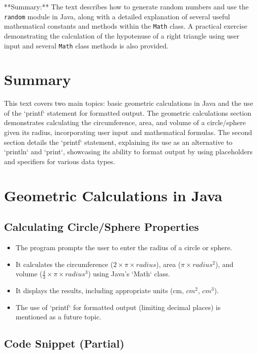 \documentclass{article}
\begin{document}
**Summary:** The text describes how to generate random numbers and use the \texttt{random} module in Java, along with a detailed explanation of several useful mathematical constants and methods within the \texttt{Math} class.  A practical exercise demonstrating the calculation of the hypotenuse of a right triangle using user input and several \texttt{Math} class methods is also provided.


\section{Summary}

This text covers two main topics: basic geometric calculations in Java and the use of the `printf` statement for formatted output.  The geometric calculations section demonstrates calculating the circumference, area, and volume of a circle/sphere given its radius, incorporating user input and mathematical formulas. The second section details the `printf` statement, explaining its use as an alternative to `println` and `print`, showcasing its ability to format output by using placeholders and specifiers for various data types.

\section{Geometric Calculations in Java}

\subsection{Calculating Circle/Sphere Properties}

\begin{itemize}
    \item The program prompts the user to enter the radius of a circle or sphere.
    \item It calculates the circumference ($2 \times \pi \times radius$), area ($\pi \times radius^2$), and volume ($\frac{4}{3} \times \pi \times radius^3$) using Java's `Math` class.
    \item It displays the results, including appropriate units (cm, $cm^2$, $cm^3$).
    \item The use of `printf` for formatted output (limiting decimal places) is mentioned as a future topic.
\end{itemize}

\subsection{Code Snippet (Partial)}
\end{document}
